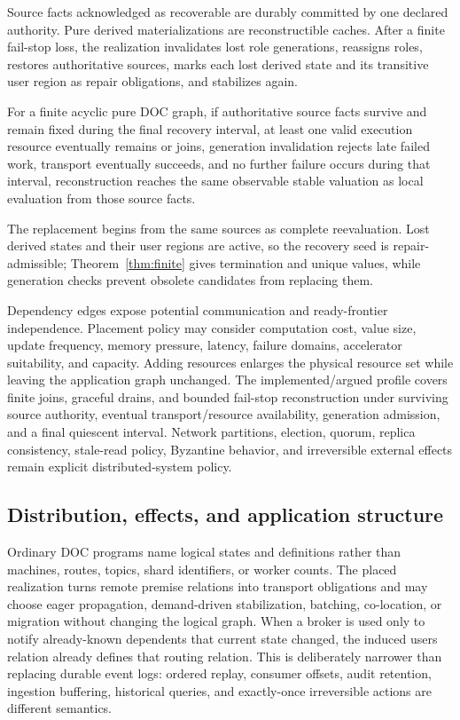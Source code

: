 \begin{definition}\label{def:recoverable}
Source facts acknowledged as recoverable are durably committed by one declared authority. Pure derived materializations are reconstructible caches. After a finite fail-stop loss, the realization invalidates lost role generations, reassigns roles, restores authoritative sources, marks each lost derived state and its transitive user region as repair obligations, and stabilizes again.
\end{definition}
\begin{theorem}\label{thm:failstop}
For a finite acyclic pure DOC graph, if authoritative source facts survive and remain fixed during the final recovery interval, at least one valid execution resource eventually remains or joins, generation invalidation rejects late failed work, transport eventually succeeds, and no further failure occurs during that interval, reconstruction reaches the same observable stable valuation as local evaluation from those source facts.
\end{theorem}
The replacement begins from the same sources as complete reevaluation. Lost derived states and their user regions are active, so the recovery seed is repair-admissible; Theorem~\ref{thm:finite} gives termination and unique values, while generation checks prevent obsolete candidates from replacing them.

Dependency edges expose potential communication and ready-frontier independence. Placement policy may consider computation cost, value size, update frequency, memory pressure, latency, failure domains, accelerator suitability, and capacity. Adding resources enlarges the physical resource set while leaving the application graph unchanged. The implemented/argued profile covers finite joins, graceful drains, and bounded fail-stop reconstruction under surviving source authority, eventual transport/resource availability, generation admission, and a final quiescent interval. Network partitions, election, quorum, replica consistency, stale-read policy, Byzantine behavior, and irreversible external effects remain explicit distributed-system policy.

\subsection{Distribution, effects, and application structure}
Ordinary DOC programs name logical states and definitions rather than machines, routes, topics, shard identifiers, or worker counts. The placed realization turns remote premise relations into transport obligations and may choose eager propagation, demand-driven stabilization, batching, co-location, or migration without changing the logical graph. When a broker is used only to notify already-known dependents that current state changed, the induced users relation already defines that routing relation. This is deliberately narrower than replacing durable event logs: ordered replay, consumer offsets, audit retention, ingestion buffering, historical queries, and exactly-once irreversible actions are different semantics.

